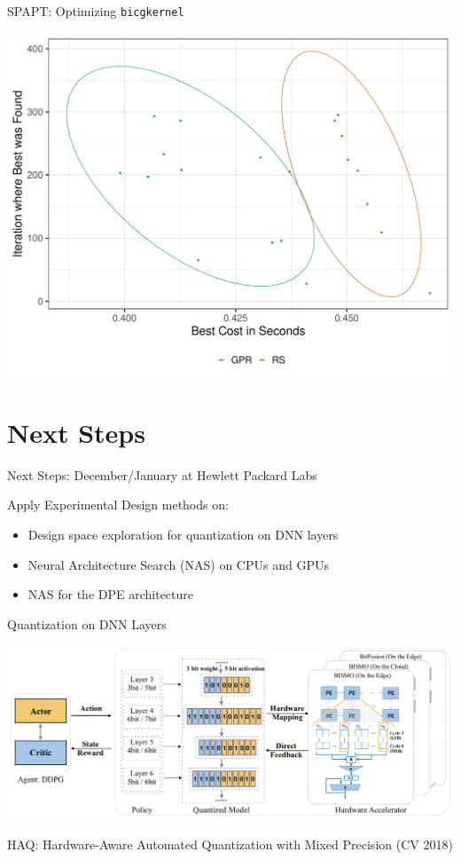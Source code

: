 \documentclass[10pt, compress, aspectratio=169, xcolor={table,usenames,dvipsnames}]{beamer}
\begin{document}
\begin{frame}[label={sec:org7650964},fragile]{SPAPT: Optimizing \texttt{bicgkernel}}
 \begin{center}
\begin{center}
\includegraphics[width=.7\columnwidth]{../../../img/updated_bicgkernel.pdf}
\end{center}
\end{center}
\end{frame}
\section{Next Steps}
\label{sec:orgb19d1da}
\begin{frame}[label={sec:org43c0d72}]{Next Steps: December/January at Hewlett Packard Labs}
\begin{block}{Apply Experimental Design methods on:}
\begin{itemize}
\item Design space exploration for \alert{quantization} on DNN layers
\item Neural Architecture Search (\alert{NAS}) on CPUs and GPUs
\item NAS for the \alert{DPE} architecture
\end{itemize}
\end{block}
\end{frame}
\begin{frame}[label={sec:org5949031}]{Quantization on DNN Layers}
\begin{center}
\includegraphics[width=\columnwidth]{../../../img/haq_quantization.png}
\end{center}

\begin{center}
\scriptsize{HAQ: Hardware-Aware Automated Quantization with Mixed Precision (CV 2018)}
\end{center}
\end{frame}
\end{document}

